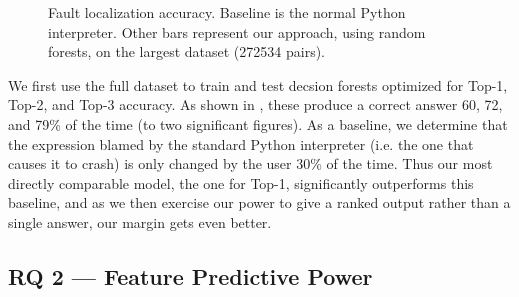 \documentclass[conference]{IEEEtran}
\begin{document}
\begin{figure}
\caption{Fault localization accuracy.
Baseline is the normal Python interpreter. Other bars represent
our approach, using random forests,
on the largest dataset (272534 pairs).}
\label{fig-full-dataset-acc-random-forest}
\end{figure}

We first use the full dataset to train and test decsion forests optimized for
Top-1, Top-2, and Top-3 accuracy. As shown in ,
these produce a correct answer 60, 72, and
79\% of the time (to two significant figures). As a baseline, we determine that
the expression blamed by the standard Python interpreter (i.e. the one that
causes it to crash) is only changed by the user 30\% of the time. Thus our
most directly comparable model, the one for Top-1, significantly outperforms
this baseline, and as we then exercise our power to give a ranked output rather
than a single answer, our margin gets even better.


\subsection{RQ 2 --- Feature Predictive Power}
\end{document}
